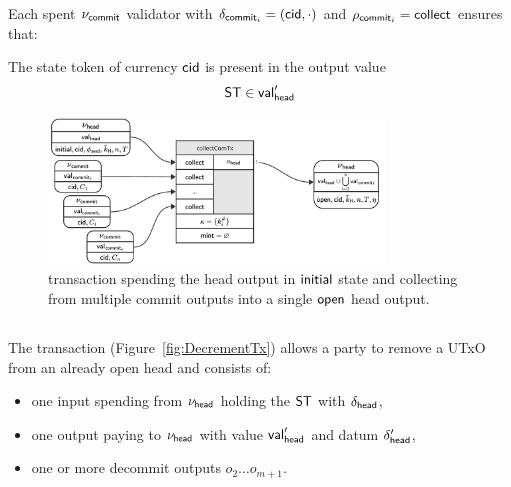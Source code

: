 \noindent Each spent $\nu_{\mathsf{commit}}$ validator with $\delta_{\mathsf{commit}_{i}} = (\mathsf{cid},\cdot)$ and $\rho_{\mathsf{commit}_{i}} = \mathsf{collect}$ ensures that:
\begin{menumerate}
	\item The state token of currency $\mathsf{cid}$ is present in the output value
	\[
		\mathsf{ST} \in \mathsf{val}_{\mathsf{head}}'
	\]
\end{menumerate}

\begin{figure}
	\centering
	\includegraphics[width=0.8\textwidth]{figures/collectComTx.pdf}
	\caption{\mtxCCom{} transaction spending the head output in $\mathsf{initial}$
		state and collecting from multiple commit outputs into a single
		$\mathsf{open}$ head output.}\label{fig:collectComTx}
\end{figure}

\subsection{}\label{sec:decrement-tx}

\noindent The \mtxDecrement{} transaction (Figure~\ref{fig:DecrementTx}) allows
a party to remove a UTxO from an already open head and consists of:

\begin{itemize}
	\item one input spending from $\nu_\mathsf{head}$ holding the $\mathsf{ST}$ with $\delta_{\mathsf{head}}$,
	\item one output paying to $\nu_\mathsf{head}$ with value $\mathsf{val}_{\mathsf{head}}'$ and
	      datum $\delta_{\mathsf{head}}'$,
	\item one or more decommit outputs $o_{2} \dots o_{m+1}$.
\end{itemize}


